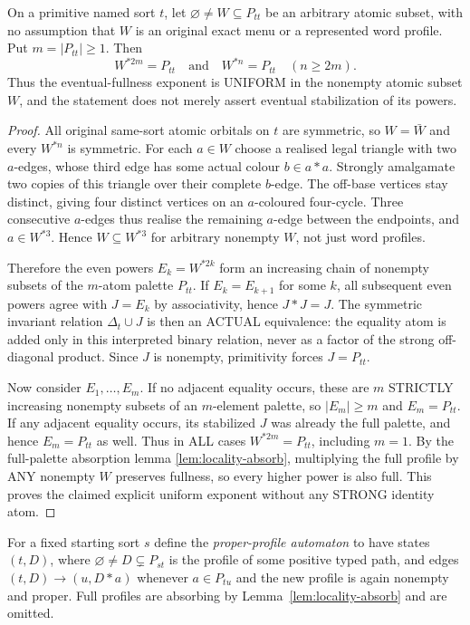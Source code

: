 \begin{lemma}
\label{lem:locality-positive}
On a primitive named sort $t$, let $\varnothing\ne W\subseteq
P_{tt}$ be an arbitrary atomic subset, with no assumption that
$W$ is an original exact menu or a represented word profile.
Put $m=|P_{tt}|\ge1$. Then
\[
                 W^{*2m}=P_{tt}
       \quad\text{and}\quad
                 W^{*n}=P_{tt}\quad(n\ge2m).
\]
Thus the eventual-fullness exponent is UNIFORM in the
nonempty atomic subset $W$, and the statement does not
merely assert eventual stabilization of its powers.
\end{lemma}
\begin{proof}
All original same-sort atomic orbitals on $t$ are symmetric,
so $W=\bar W$ and every $W^{*n}$ is symmetric.  For each
$a\in W$ choose a realised legal triangle with two $a$-edges,
whose third edge has some actual colour $b\in a*a$.
Strongly amalgamate two copies of this triangle over their
complete $b$-edge.  The off-base vertices stay distinct,
giving four distinct vertices on an $a$-coloured four-cycle.
Three consecutive $a$-edges thus realise the remaining $a$-edge
between the endpoints, and $a\in W^{*3}$.  Hence
$W\subseteq W^{*3}$ for arbitrary nonempty $W$, not just
word profiles.

Therefore the even powers
$E_k=W^{*2k}$ form an increasing chain of nonempty
subsets of the $m$-atom palette $P_{tt}$.
If $E_k=E_{k+1}$ for some $k$, all subsequent even
powers agree with $J=E_k$ by associativity, hence
$J*J=J$.  The symmetric invariant relation
$\Delta_t\cup J$ is then an ACTUAL equivalence:
the equality atom is added only in this interpreted
binary relation, never as a factor of the strong
off-diagonal product.  Since $J$ is nonempty,
primitivity forces $J=P_{tt}$.

Now consider $E_1,\ldots,E_m$.  If no adjacent
equality occurs, these are $m$ STRICTLY increasing
nonempty subsets of an $m$-element palette, so
$|E_m|\ge m$ and $E_m=P_{tt}$.
If any adjacent equality occurs, its stabilized
$J$ was already the full palette, and hence
$E_m=P_{tt}$ as well.  Thus in ALL cases
$W^{*2m}=P_{tt}$, including $m=1$.
By the full-palette absorption lemma
\cref{lem:locality-absorb},
multiplying the full profile by ANY nonempty
$W$ preserves fullness, so every higher power is
also full.  This proves the claimed explicit
uniform exponent without any STRONG identity atom.
\end{proof}

For a fixed starting sort $s$ define the \emph{proper-profile
automaton} to have states $(t,D)$, where
$\varnothing\ne D\subsetneq P_{st}$ is the profile of some positive
typed path, and edges
$(t,D)\to(u,D*a)$ whenever $a\in P_{tu}$ and the new profile
is again nonempty and proper. Full profiles are absorbing by
Lemma~\ref{lem:locality-absorb} and are omitted.

